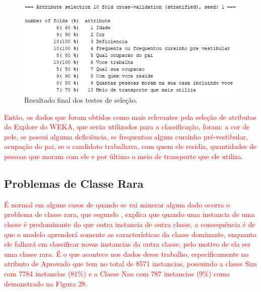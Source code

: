 \par
\begin{figure}[!htp]
	\begin{center}
    \caption{\label{fig:waveform_fig} Resultado final dos testes de seleção.}
	\includegraphics[scale=0.99]{Figuras/10_atributos.png}
	\end{center}
\end{figure}

\par
\textcolor{red}{Então, os dados que foram obtidos como mais relevantes pela seleção de atributos do Explore do WEKA, que serão utilizados para a classificação, foram: a cor de pele, se possui alguma deficiência, se frequentou algum cursinho pré-vestibular, ocupação do pai, se o candidato trabalhava, com quem ele residia, quantidades de pessoas que moram com ele e por último o meio de transporte que ele utiliza.}

\subsection{Problemas de Classe Rara}

\par
\textcolor{red}{É normal em alguns casos de quando se vai minerar algum dado ocorra o problema de classe rara, que segundo , explica que quando uma instancia de uma classe é predominante do que outra instancia de outra classe, a consequência é de que o modelo aprenderá somente as características da classe dominante, enquanto ele falhará em classificar novas instancias da outra classe, pelo motivo de ela ser uma classe rara. É o que acontece nos dados desse trabalho, especificamente no atributo de Aprovado que tem no total de 8571 instancias, possuindo a classe Sim com 7784 instancias (81\%) e a Classe Nao com 787 instancias (9\%) como demonstrado na Figura 28.}

